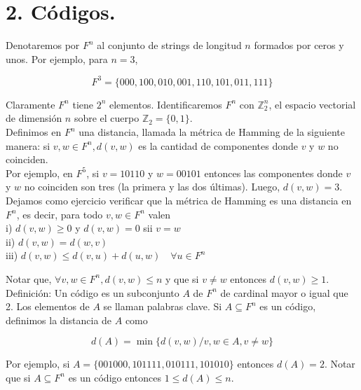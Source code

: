 \documentclass[10pt]{article}
\begin{document}
\section*{2. Códigos.}
Denotaremos por $F^{n}$ al conjunto de strings de longitud $n$ formados por ceros y unos. Por ejemplo, para $n=3$,

$$
F^{3}=\{000,100,010,001,110,101,011,111\}
$$

Claramente $F^{n}$ tiene $2^{n}$ elementos. Identificaremos $F^{n}$ con $\mathbb{Z}_{2}^{n}$, el espacio vectorial de dimensión $n$ sobre el cuerpo $\mathbb{Z}_{2}=\{0,1\}$.\\
Definimos en $F^{n}$ una distancia, llamada la métrica de Hamming de la siguiente manera: si $v, w \in F^{n}, d(v, w)$ es la cantidad de componentes donde $v$ y $w$ no coinciden.\\
Por ejemplo, en $F^{5}$, si $v=10110$ y $w=00101$ entonces las componentes donde $v$ y $w$ no coinciden son tres (la primera y las dos últimas). Luego, $d(v, w)=3$.\\
Dejamos como ejercicio verificar que la métrica de Hamming es una distancia en $F^{n}$, es decir, para todo $v, w \in F^{n}$ valen\\
i) $d(v, w) \geq 0$ y $d(v, w)=0$ sii $v=w$\\
ii) $d(v, w)=d(w, v)$\\
iii) $d(v, w) \leq d(v, u)+d(u, w) \quad \forall u \in F^{n}$

Notar que, $\forall v, w \in F^{n}, d(v, w) \leq n$ y que si $v \neq w$ entonces $d(v, w) \geq 1$.\\
Definición: Un código es un subconjunto $A$ de $F^{n}$ de cardinal mayor o igual que 2. Los elementos de $A$ se llaman palabras clave. Si $A \subseteq F^{n}$ es un código, definimos la distancia de $A$ como

$$
d(A)=\min \{d(v, w) / v, w \in A, v \neq w\}
$$

Por ejemplo, si $A=\{001000,101111,010111,101010\}$ entonces $d(A)=2$. Notar que si $A \subseteq F^{n}$ es un código entonces $1 \leq d(A) \leq n$.
\end{document}
